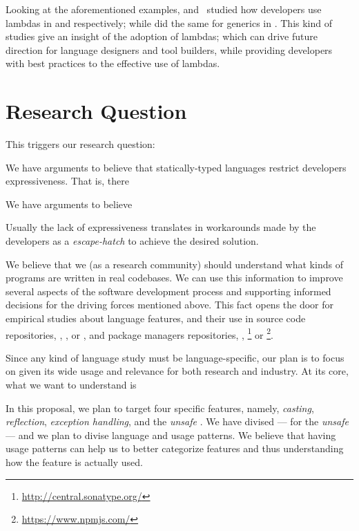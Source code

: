Looking at the aforementioned examples, \cite{mazinanian_understanding_2017} and~\cite{uesbeck_empirical_2016}
studied how developers use lambdas in \java{} and \cpp{} respectively; while \cite{parnin_java_2011,parnin_adoption_2013} did the same for generics in \java{}.
This kind of studies give an insight of the adoption of lambdas;
which can drive future direction for language designers and tool builders,
while providing developers with best practices to the effective use of lambdas.


\section{Research Question}

This triggers our research question:




We have arguments to believe that statically-typed languages restrict developers expressiveness.
That is, there 

We have arguments to believe

Usually the lack of expressiveness translates in workarounds made by the developers as a \emph{escape-hatch} to achieve the desired solution.


We believe that we (as a research community) should understand what kinds of programs are written in real codebases.
We can use this information to improve several aspects of the software development process and supporting informed decisions for the driving forces mentioned above.
This fact opens the door for empirical studies about language features, and their use in source code repositories, \eg{}, \github{}, \gitlab{} or \bitbucket{}, and package managers repositories, \eg{}, \mavencentral{}\footnote{\url{http://central.sonatype.org/}} or
\npm{}\footnote{\url{https://www.npmjs.com/}}.

Since any kind of language study must be language-specific, our plan is to focus on \java{} given its wide usage and relevance for both research and industry.
At its core, what we want to understand is



In this proposal, we plan to target four specific \java{} features, namely, \emph{casting}, \emph{reflection}, \emph{exception handling}, and the \emph{unsafe \api{}}.
We have divised --- for the \emph{unsafe} \api{} --- and we plan to divise language and \api{} usage patterns.
We believe that having usage patterns can help us to better categorize features and thus understanding how the feature is actually used.


